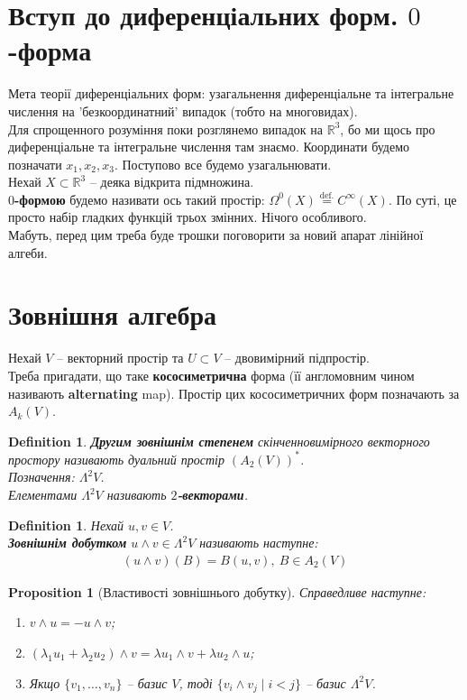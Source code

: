 \documentclass[a4paper, 10pt]{article}
\theoremstyle{theoremdd}
\theoremstyle{theoremdd}
\theoremstyle{theoremdd}
\newtheorem{definition}[theorem]{Definition}
\theoremstyle{theoremdd}
\theoremstyle{theoremdd}
\theoremstyle{theoremdd}
\newtheorem{proposition}[theorem]{Proposition}
\theoremstyle{theoremdd}
\theoremstyle{theoremdd}
\theoremstyle{theoremdd}
\begin{document}
\section*{Вступ до диференціальних форм. $0$-форма}
Мета теорії диференціальних форм: узагальнення диференціальне та інтегральне числення на 'безкоординатний' випадок (тобто на многовидах).\\
Для спрощенного розуміння поки розглянемо випадок на $\mathbb{R}^3$, бо ми щось про диференціальне та інтегральне числення там знаємо. Координати будемо позначати $x_1,x_2,x_3$. Поступово все будемо узагальнювати.
\bigskip \\
Нехай $X \subset \mathbb{R}^3$ -- деяка відкрита підмножина.\\
\textbf{$0$-формою} будемо називати ось такий простір: $\Omega^0(X) \overset{\text{def.}}{=} C^\infty(X)$. По суті, це просто набір гладких функцій трьох змінних. Нічого особливого.
\bigskip \\
Мабуть, перед цим треба буде трошки поговорити за новий апарат лінійної алгеби.
\newpage

\section{Зовнішня алгебра}
Нехай $V$ -- векторний простір та $U \subset V$ -- двовимірний підпростір.
\bigskip \\
Треба пригадати, що таке \textbf{кососиметрична} форма (її англомовним чином називають \textbf{alternating} map). Простір цих кососиметричних форм позначають за $A_k(V)$.

\begin{definition}
\textbf{Другим зовнішнім степенем} скінченновимірного векторного простору називають дуальний простір $(A_2(V))^*$.\\
Позначення: $\Lambda^2 V$.\\
Елементами $\Lambda^2 V$ називають \textbf{$2$-векторами}.
\end{definition}

\begin{definition}
Нехай $u,v \in V$.\\
\textbf{Зовнішнім добутком} $u \wedge v \in \Lambda^2 V$ називають наступне:
\begin{align*}
(u \wedge v)(B) = B(u,v),\ B \in A_2(V)
\end{align*}
\end{definition}

\begin{proposition}[Властивості зовнішнього добутку]
Справедливе наступне:
\begin{enumerate}[nosep,wide=0pt,label={\arabic*)}]
\item $v \wedge u = -u \wedge v$;
\item $(\lambda_1 u_1 + \lambda_2 u_2) \wedge v = \lambda u_1 \wedge v + \lambda u_2 \wedge u$;
\item Якщо $\{v_1,\dots,v_n\}$ -- базис $V$, тоді $\{ v_i \wedge v_j \mid i < j \}$ -- базис $\Lambda^2 V$.
\end{enumerate}
\end{proposition}
\end{document}
